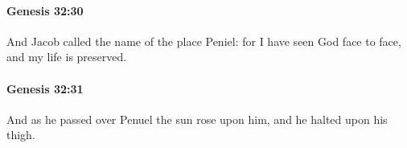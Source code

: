 		\paragraph{Genesis 32:30} %
			\label{GENESIS-32-30}

			And Jacob called the name of the place Peniel: for I have seen God face to face, and my life is preserved.


		\paragraph{Genesis 32:31} %
			\label{GENESIS-32-31}

			And as he passed over Penuel the sun rose upon him, and he halted upon his thigh.


